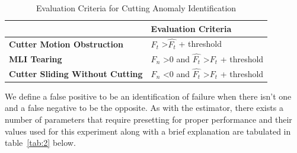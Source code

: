 \documentclass[letterpaper, 10 pt, conference]{ieeeconf}  %
\begin{document}
\begin{table}[h]
\caption{Evaluation Criteria for Cutting Anomaly Identification}
\label{tab:1}
\begin{tabular}{|l|l|}
\hline
\multicolumn{1}{|l|}{} & \textbf{Evaluation Criteria} \\ \hline
\textbf{Cutter Motion Obstruction} & $F_t$  \textgreater $ \hat{F_t}$ + threshold \\ \hline
\textbf{MLI Tearing} & $F_n$ \textgreater 0 and $\hat{F_t}$ \textgreater $F_t$ + threshold \\ \hline
\textbf{Cutter Sliding Without Cutting} & $F_n$ \textless 0 and $\hat{F_t}$ \textgreater $F_t$ + threshold\\  \hline
\end{tabular}
\end{table}
 
We define a false positive to be an identification of failure when there isn't one and a false negative to be the opposite. As with the estimator, there exists a number of parameters that require presetting for proper performance and their values used for this experiment along with a brief explanation are tabulated in table~\ref{tab:2} below.
\end{document}
